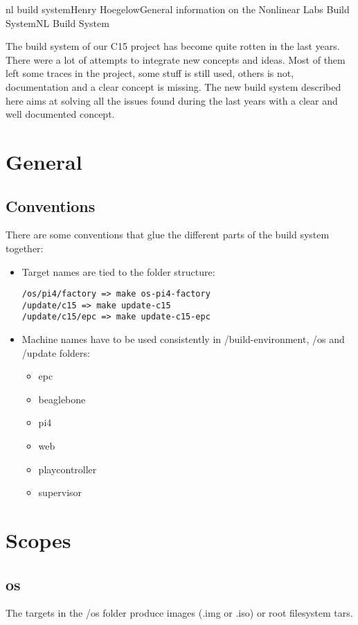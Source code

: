 \documentclass[11pt]{article}
\begin{document}
\begin{Name}{1}{nl build system}{Henry Hoegelow}{General information on the Nonlinear Labs Build System}{NL Build System}

The build system of our C15 project has become quite rotten in the last years. There were a lot of attempts to integrate new concepts and ideas. Most of them left some traces in the project, some stuff is still used, others is not, documentation and a clear concept is missing. The new build system described here aims at solving all the issues found during the last years with a clear and well documented concept.

\section{General}

\subsection{Conventions}
There are some conventions that glue the different parts of the build system together:
\begin{itemize}
\item Target names are tied to the folder structure: 
\begin{verbatim}
/os/pi4/factory => make os-pi4-factory
/update/c15 => make update-c15
/update/c15/epc => make update-c15-epc
\end{verbatim}
\item Machine names have to be used consistently in /build-environment, /os and /update folders:
\begin{itemize} \label{machine}
\item epc
\item beaglebone
\item pi4
\item web
\item playcontroller
\item supervisor
\end{itemize}
\end{itemize}

\section{Scopes}

\subsection{os}
The targets in the /os folder produce images (.img or .iso) or root filesystem tars. 


\end{Name}
\end{document}
